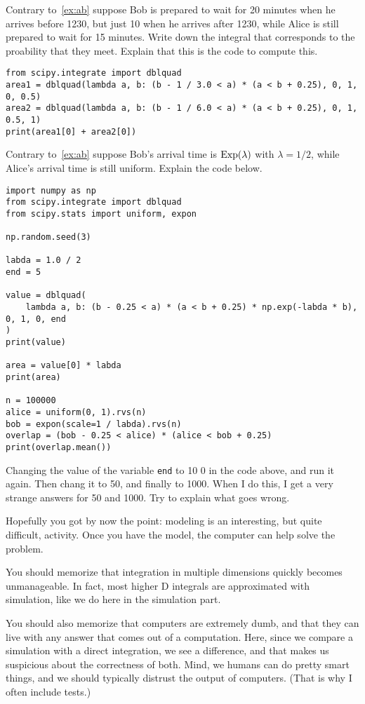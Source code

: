 \begin{exercise}
Contrary to~\cref{ex:ab} suppose Bob is prepared to wait for 20 minutes when he arrives before 1230, but just 10 when he arrives after 1230, while Alice is still prepared to wait for 15 minutes. Write down the integral that corresponds to the proability that they meet. Explain that this is the code to compute this.

\begin{verbatim}
from scipy.integrate import dblquad
area1 = dblquad(lambda a, b: (b - 1 / 3.0 < a) * (a < b + 0.25), 0, 1, 0, 0.5)
area2 = dblquad(lambda a, b: (b - 1 / 6.0 < a) * (a < b + 0.25), 0, 1, 0.5, 1)
print(area1[0] + area2[0])
\end{verbatim}
\end{exercise}

\begin{exercise}
Contrary to~\cref{ex:ab} suppose Bob's arrival time is $\mathrm{Exp}(\lambda)$ with $\lambda=1/2$,  while Alice's arrival time is still uniform.
Explain the code below.
\begin{verbatim}
import numpy as np
from scipy.integrate import dblquad
from scipy.stats import uniform, expon

np.random.seed(3)

labda = 1.0 / 2
end = 5

value = dblquad(
    lambda a, b: (b - 0.25 < a) * (a < b + 0.25) * np.exp(-labda * b), 0, 1, 0, end
)
print(value)

area = value[0] * labda
print(area)

n = 100000
alice = uniform(0, 1).rvs(n)
bob = expon(scale=1 / labda).rvs(n)
overlap = (bob - 0.25 < alice) * (alice < bob + 0.25)
print(overlap.mean())
\end{verbatim}
\end{exercise}

\begin{exercise}
Changing the value of the variable \verb|end| to 10 0 in the code above, and run it again. Then chang  it to 50, and finally to 1000.  When I do this, I get a very strange answers for 50 and 1000. Try to explain what goes wrong.
\end{exercise}


Hopefully you got by now the point: modeling is an interesting, but  quite difficult, activity. Once you have the model, the computer can help solve the problem.


You should memorize that integration in multiple dimensions quickly becomes unmanageable. In fact, most higher D integrals are approximated with simulation, like we do here in the simulation part.

You should also memorize that computers are extremely dumb, and that they can live with any answer that comes out of a computation. Here, since we compare a simulation with a direct integration, we see a difference, and that makes us suspicious about the correctness of both. Mind, we humans can do pretty smart things, and we should typically distrust the output of computers. (That is why I often include tests.)
